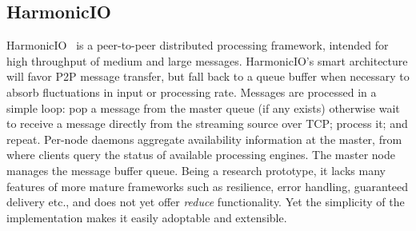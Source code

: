 \documentclass[conference]{IEEEtran}
\begin{document}



\subsection{HarmonicIO}

HarmonicIO~\cite{torruangwatthanaHarmonicIOScalableData2018} is a peer-to-peer distributed processing framework, intended for high throughput of medium and large messages. 
HarmonicIO's smart architecture will favor P2P message transfer, but fall back to a queue buffer when necessary to absorb fluctuations in input or processing rate. Messages are processed in a simple loop: pop a message from the master queue (if any exists) otherwise wait to receive a message directly from the streaming source over TCP; process it; and repeat. Per-node daemons aggregate availability information at the master, from where clients query the status of available processing engines. The master node manages the message buffer queue.
Being a research prototype, it lacks many features of more mature frameworks such as resilience, error handling, guaranteed delivery etc., and does not yet offer \emph{reduce} functionality. Yet the simplicity of the implementation makes it easily adoptable and extensible.
\end{document}

